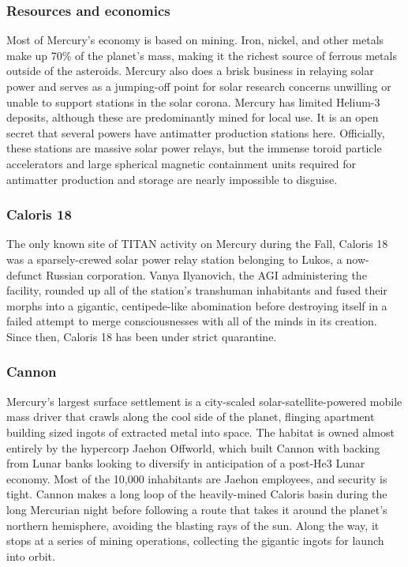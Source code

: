 \subsubsection{Resources and economics} \label{sec:resources-and-economics} 

Most of Mercury's economy is based on mining. Iron, nickel, and other metals make up 70\% of the planet's mass, making it the richest source of ferrous metals outside of the asteroids. Mercury also does a brisk business in relaying solar power and serves as a jumping-off point for solar research concerns unwilling or unable to support stations in the solar corona. Mercury has limited Helium-3 deposits, although these are predominantly mined for local use. It is an open secret that several powers have antimatter production stations here. Officially, these stations are massive solar power relays, but the immense toroid particle accelerators and large spherical magnetic containment units required for antimatter production and storage are nearly impossible to disguise. 

\subsubsection{Caloris 18} \label{sec:caloris-18} 

The only known site of TITAN activity on Mercury during the Fall, Caloris 18 was a sparsely-crewed solar power relay station belonging to Lukos, a now-defunct Russian corporation. Vanya Ilyanovich, the AGI administering the facility, rounded up all of the station's transhuman inhabitants and fused their morphs into a gigantic, centipede-like abomination before destroying itself in a failed attempt to merge consciousnesses with all of the minds in its creation. Since then, Caloris 18 has been under strict quarantine. 

\subsubsection{Cannon} \label{sec:cannon} 

Mercury's largest surface settlement is a city-scaled solar-satellite-powered mobile mass driver that crawls along the cool side of the planet, flinging apartment building sized ingots of extracted metal into space. The habitat is owned almost entirely by the hypercorp Jaehon Offworld, which built Cannon with backing from Lunar banks looking to diversify in anticipation of a post-He3 Lunar economy. Most of the 10,000 inhabitants are Jaehon employees, and security is tight. Cannon makes a long loop of the heavily-mined Caloris basin during the long Mercurian night before following a route that takes it around the planet's northern hemisphere, avoiding the blasting rays of the sun. Along the way, it stops at a series of mining operations, collecting the gigantic ingots for launch into orbit. 

